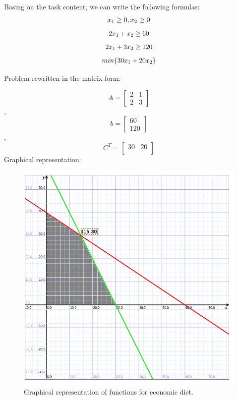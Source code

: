 \documentclass[eng,openany]{mgr}
\begin{document}
Basing on the task content, we can write the following formulas:\\
\begin{equation*}
x_1 \geq 0, x_2\geq 0\\
\end{equation*}
\begin{equation*}
2x_1 + x_2 \geq 60\\
\end{equation*}
\begin{equation*}
2x_1 + 3x_2 \geq 120\\
\end{equation*}
\begin{equation*}
min\{30x_1+20x_2\}\\
\end{equation*}


Problem rewritten in the matrix form:

\[
A =
\begin{bmatrix}
2 & 1 \\
2 & 3
\end{bmatrix}
\]
,
\[
b =
\begin{bmatrix}
60 \\ 120
\end{bmatrix}
\],
\[
C^T =
\begin{bmatrix}
30 & 20\\
\end{bmatrix}
\]
Graphical representation:
\begin{figure}[h]
	\centering
	\includegraphics[width=0.5\linewidth]{screenshot006}
	\caption{Graphical representation of functions for economic diet.}
	\label{fig:screenshot006}
\end{figure}
\end{document}
